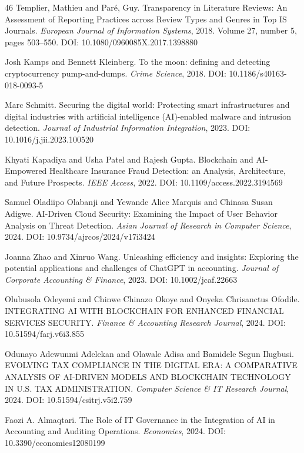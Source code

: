 \documentclass[3p,times,procedia]{elsarticle}
\begin{document}
\begin{thebibliography}{46}
Templier, Mathieu and {Par\'e}, Guy.
Transparency in Literature Reviews: An Assessment of Reporting Practices across Review Types and Genres in Top {IS} Journals.
\textit{European Journal of Information Systems}, 2018.
Volume 27, number 5, pages 503--550.
DOI: 10.1080/0960085X.2017.1398880

Josh Kamps and Bennett Kleinberg.
To the moon: defining and detecting cryptocurrency pump-and-dumps.
\textit{Crime Science}, 2018.
DOI: 10.1186/s40163-018-0093-5

Marc Schmitt.
Securing the digital world: Protecting smart infrastructures and digital industries with artificial intelligence (AI)-enabled malware and intrusion detection.
\textit{Journal of Industrial Information Integration}, 2023.
DOI: 10.1016/j.jii.2023.100520

Khyati Kapadiya and Usha Patel and Rajesh Gupta.
Blockchain and AI-Empowered Healthcare Insurance Fraud Detection: an Analysis, Architecture, and Future Prospects.
\textit{IEEE Access}, 2022.
DOI: 10.1109/access.2022.3194569

Samuel Oladiipo Olabanji and Yewande Alice Marquis and Chinasa Susan Adigwe.
AI-Driven Cloud Security: Examining the Impact of User Behavior Analysis on Threat Detection.
\textit{Asian Journal of Research in Computer Science}, 2024.
DOI: 10.9734/ajrcos/2024/v17i3424

Joanna Zhao and Xinruo Wang.
Unleashing efficiency and insights: Exploring the potential applications and challenges of ChatGPT in accounting.
\textit{Journal of Corporate Accounting \& Finance}, 2023.
DOI: 10.1002/jcaf.22663

Olubusola Odeyemi and Chinwe Chinazo Okoye and Onyeka Chrisanctus Ofodile.
INTEGRATING AI WITH BLOCKCHAIN FOR ENHANCED FINANCIAL SERVICES SECURITY.
\textit{Finance \& Accounting Research Journal}, 2024.
DOI: 10.51594/farj.v6i3.855

Odunayo Adewunmi Adelekan and Olawale Adisa and Bamidele Segun Ilugbusi.
EVOLVING TAX COMPLIANCE IN THE DIGITAL ERA: A COMPARATIVE ANALYSIS OF AI-DRIVEN MODELS AND BLOCKCHAIN TECHNOLOGY IN U.S. TAX ADMINISTRATION.
\textit{Computer Science \& IT Research Journal}, 2024.
DOI: 10.51594/csitrj.v5i2.759

Faozi A. Almaqtari.
The Role of IT Governance in the Integration of AI in Accounting and Auditing Operations.
\textit{Economies}, 2024.
DOI: 10.3390/economies12080199


\end{thebibliography}
\end{document}
